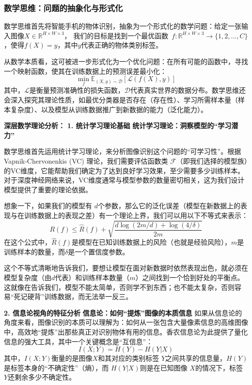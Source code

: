 \subsubsection{数学思维：问题的抽象化与形式化}

数学思维首先将智能手机的物体识别，抽象为一个形式化的数学问题：给定一张输入图像$X \in \mathbb{R}^{H \times W \times 3}$，
我们的目标是找到一个最优函数~$f: \mathbb{R}^{H \times W \times 3} \rightarrow \{1, 2, ..., C\}$，使得$f(X) = y$，其中$y$代表正确的物体类别标签。

从数学本质看，这可被进一步形式化为一个优化问题：在所有可能的函数中，寻找一个映射函数，使其在训练数据上的预测误差最小化：
$$\min_{f} \mathbb{E}_{(X,y) \sim \mathcal{D}}[\mathcal{L}(f(X), y)]$$
其中，$\mathcal{L}$是衡量预测准确性的损失函数，$\mathcal{D}$代表真实世界的数据分布。数学思维还会深入探究其理论性质，如最优分类器是否存在（存在性）、学习所需样本量（样本复杂度）、以及模型从训练数据推广到新数据的能力（泛化能力）。
 

\textbf{深层数学理论分析：}
\textbf{1. 统计学习理论基础}
\textbf{统计学习理论：洞察模型的“学习潜力”}

数学思维首先运用统计学习理论，来分析图像识别这个问题的“可学习性”。根据 Vapnik-Chervonenkis (VC) 理论，我们需要评估函数类 $\mathcal{F}$（即我们选择的模型族）的VC维度，它能帮助我们确定为了达到良好学习效果，至少需要多少训练样本。对于深度神经网络来说，VC维度通常与模型参数的数量密切相关，这为我们设计模型提供了重要的理论依据。

想象一下，如果我们的模型有 $d$个参数，那么它的泛化误差（模型在新数据上的表现与在训练数据上的表现之差）有一个理论上界，我们可以用以下不等式来表示：
$$R(f) \leq \hat{R}(f) + \sqrt{\frac{d \log(2m/d) + \log(4/\delta)}{2m}}$$
在这个公式中，$\hat{R}(f)$是模型在已知训练数据上的风险（也就是经验风险），$m$是训练样本的数量，而$\delta$是一个置信度参数。

这个不等式清晰地告诉我们，要想让模型在面对新数据时依然表现出色，就必须在模型复杂度（由$d$代表）和训练样本数量（$m$）之间找到一个恰到好处的平衡点。这就像在告诉我们，模型不能太简单，否则学不到东西；也不能太复杂，否则容易“死记硬背”训练数据，而无法举一反三。
 
 \textbf{2. 信息论视角的特征分析}
\textbf{信息论：如何“提炼”图像的本质信息}
如果从信息论的角度来看，图像识别的本质可以理解为：如何从一张包含大量像素信息的高维图像中，高效地“提炼”出那些真正对识别物体有用的信息。香农信息论为此提供了量化信息的强大工具，其中一个关键概念是“互信息”：
$$I(X; Y) = H(Y) - H(Y|X)$$
其中，$I(X; Y)$衡量的是图像$X$和其对应的类别标签 $Y$之间共享的信息量，$H(Y)$ 是标签本身的“不确定性”（熵），而 $H(Y|X)$则是在已知图像 $X$的情况下，标签 $Y$还剩余多少不确定性。


